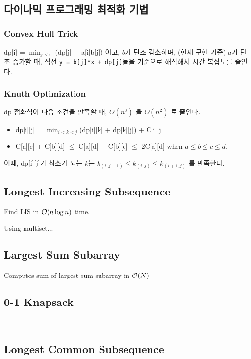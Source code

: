\documentclass[landscape,8pt]{article}
\begin{document}
\begin{multicols}{2}
  \subsection{다이나믹 프로그래밍 최적화 기법}
  \subsubsection{Convex Hull Trick}
    dp[i] = $\min_{j < i}$ (dp[j] + a[i]b[j]) 이고, $b$가 단조 감소하며, (현재 구현 기준) $a$가 단조 증가할 때, 직선 \texttt{y = b[j]*x + dp[j]}들을 기준으로 해석해서 시간 복잡도를 줄인다.
    
  \subsubsection{Knuth Optimization}
    dp 점화식이 다음 조건을 만족할 때, $O(n^3)$ 을 $O(n^2)$ 로 줄인다.
    \begin{itemize}
      \item dp[i][j] = $\min_{i < k < j}$(dp[i][k] + dp[k][j]) + C[i][j]
      \item C[a][c] + C[b][d] $\leq$ C[a][d] + C[b][c] $\leq$ 2C[a][d] when $a \leq b \leq c \leq d$.
    \end{itemize}
    이때, dp[i][j]가 최소가 되는 $k$는 $k_{(i, j-1)} \leq k_{(i, j)} \leq k_{(i+1, j)}$ 를 만족한다.
      
  \subsection{Longest Increasing Subsequence}
    Find LIS in $\order{n \log n}$ time.
      
    Using multiset...
      
  \subsection{Largest Sum Subarray}
    Computes sum of largest sum subarray in $\order{N}$
      

  \subsection{0-1 Knapsack}
    \

  \subsection{Longest Common Subsequence}
    


\end{multicols}
\end{document}
